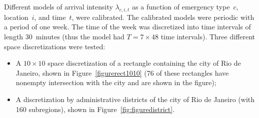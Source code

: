 \documentclass[article]{jss}
\newcommand{\ignore}[1]{}
\begin{document}
Different models of arrival intensity $\lambda_{c,i,t}$ as a function of emergency type~$c$, location~$i$, and time~$t$, were calibrated.
The calibrated models were periodic with a period of one week.
The time of the week was discretized into time intervals of length $30$~minutes (thus the model had $T = 7 \times 48$ time intervals).
Three different space discretizations were tested:
\begin{itemize}
\item
A $10 \times 10$ space discretization of a rectangle containing the city of Rio de Janeiro, shown in Figure~\ref{figurerect1010} (76 of these rectangles have nonempty intersection with the city and are shown in the figure);
\item
A discretization by administrative districts of the city of Rio de Janeiro (with 160 subregions), shown in Figure~\ref{fig:figuredistrict}.
\end{itemize}
\ignore{
Running \proglang{MATLAB} function 
$$
{\tt{[lambda,lambdacov]=laspatedSAMUrj()}}
$$
builds the data for the rectangular discretization 10x10 and runs laspated calibration function. 
The output {\tt{lambda}} is the vector of intensities obtained calibrating the model without regressors from Section \ref{sec:model1} with penalties taken equal to 0.1 while the  output {\tt{lambdacov}} is the vector of intensities obtained calibrating the model with regressors from Section \ref{sec:modelcov} with penalties taken equal to 0.1.
The outputs for other discretizations can be obtained replacing the discretization folder Rect10x10 by the discretization folders corresponding to the other spatial discretizations, namely Rect100x100, Hex7, Hex8, and Districts for respectively the rectangular 100x100, Hexagonal with Uber scale factor 7, Hexagonal with Uber scale factor 8, and by districts.
For this application, there are three arrival types corresponding to calls of low priority (arrival type $c_{0}$), calls of intermediate priority (arrival type $c_{1}$), and calls of high priority (arrival type $c_{2}$).
}
\end{document}

